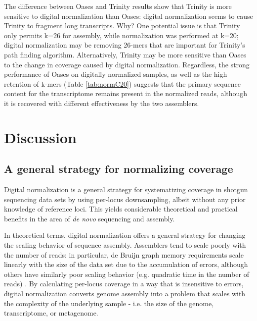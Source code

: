 \documentclass{pnastwo}
\begin{document}
\begin{article}

The difference between Oases and Trinity results show that Trinity is
more sensitive to digital normalization than Oases: digital
normalization seems to cause Trinity to fragment long transcripts.
Why?  One potential issue is that Trinity only permits k=26 for
assembly, while normalization was performed at k=20; digital
normalization may be removing 26-mers that are important for Trinity's
path finding algorithm.  Alternatively, Trinity may be more sensitive
than Oases to the change in coverage caused by digital normalization.
Regardless, the strong performance of Oases on digitally normalized
samples, as well as the high retention of k-mers (Table \ref{tab:normC20})
suggests that the primary sequence content for the transcriptome remains
present in the normalized reads, although it is recovered with different
effectiveness by the two assemblers.

\section{Discussion}

\subsection{A general strategy for normalizing coverage}

Digital normalization is a general strategy for systematizing coverage
in shotgun sequencing data sets by using per-locus downsampling,
albeit without any prior knowledge of reference loci.  This yields
considerable theoretical and practical benefits in the area of {\em de
  novo} sequencing and assembly.

In theoretical terms, digital normalization offers a general strategy
for changing the scaling behavior of sequence assembly.  Assemblers
tend to scale poorly with the number of reads: in particular, de
Bruijn graph memory requirements scale linearly with the size of the
data set due to the accumulation of errors, although others have
similarly poor scaling behavior (e.g. quadratic time in the number of
reads) \cite{pubmed20211242}.  By calculating per-locus coverage in a way that
is insensitive to errors, digital normalization converts
genome assembly into a problem that scales with the complexity of the
underlying sample - i.e. the size of the genome, transcriptome, or
metagenome.


\end{article}
\end{document}
